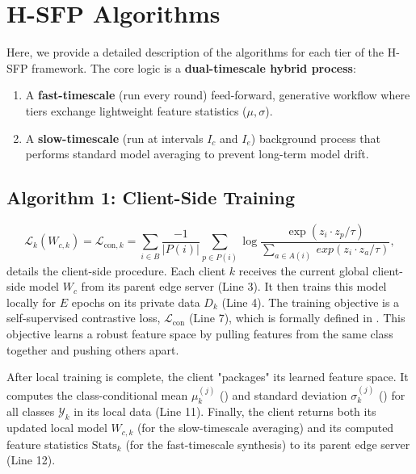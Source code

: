 \section{H-SFP Algorithms}
\label{app:algorithm}
Here, we provide a detailed description of the algorithms for each tier of the H-SFP framework. The core logic is a \textbf{dual-timescale hybrid process}:
\begin{enumerate}
    \item A \textbf{fast-timescale} (run every round) feed-forward, generative workflow where tiers exchange lightweight feature statistics ($\mu, \sigma$).
    \item A \textbf{slow-timescale} (run at intervals $I_c$ and $I_e$) background process that performs standard model averaging to prevent long-term model drift.
\end{enumerate}

\subsection*{Algorithm 1: Client-Side Training}
\begin{equation}
    \label{eq:supcon}
    \mathcal{L}_{k}(W_{c,k})= \mathcal{L}_{\text{con}, k} = \sum_{i\in B}\frac{-1}{|P(i)|}\sum_{p\in P(i)}\log\frac{\exp(z_{i}\cdot z_{p}/\tau)}{\sum_{a\in A(i)}\
    exp(z_{i}\cdot z_{a}/\tau)},
\end{equation}
 details the client-side procedure. Each client $k$ receives the current global client-side model $W_c$ from its parent edge server (Line 3). It then trains this model locally for $E$ epochs on its private data $D_k$ (Line 4). The training objective is a self-supervised contrastive loss, $\mathcal{L}_{\text{con}}$ (Line 7), which is formally defined in . This objective learns a robust feature space by pulling features from the same class together and pushing others apart.

After local training is complete, the client "packages" its learned feature space. It computes the class-conditional mean $\mu_k^{(j)}$ () and standard deviation $\sigma_k^{(j)}$ () for all classes $\mathcal{Y}_k$ in its local data (Line 11). Finally, the client returns both its updated local model $W_{c,k}$ (for the slow-timescale averaging) and its computed feature statistics $\text{Stats}_k$ (for the fast-timescale synthesis) to its parent edge server (Line 12).

